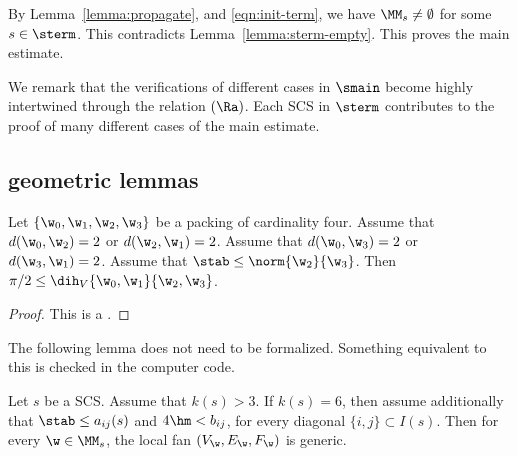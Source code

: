 By Lemma~\ref{lemma:propagate}, and \eqref{eqn:init-term}, we have
$\MM_s\ne\emptyset$ for some $s\in \sterm$. 
This contradicts Lemma~\ref{lemma:sterm-empty}.
  This proves the main estimate.


We remark that the verifications of  different cases in $\smain$ become
highly intertwined through the relation $(\Ra)$.  Each SCS
 in $\sterm$ contributes to the proof of many different cases
of the main estimate.




\subsection{geometric lemmas}

\begin{lemma}\label{lemma:scs-obtuse}
Let $\{\w_0,\w_1,\w_2,\w_3\}$ be a packing of cardinality four.
Assume that $d(\w_0,\w_2)=2$ or $d(\w_2,\w_1)=2$.
Assume that $d(\w_0,\w_3)=2$ or $d(\w_3,\w_1)=2$.
Assume that $\stab\le \norm{\w_2}{\w_3}$.  Then
$\pi/2 \le \dih_V \{\w_0,\w_1 \} \{\w_2,\w_3 \}$.
\end{lemma}

\begin{proof} This is a .
\end{proof}

The following lemma does not need to be formalized.  Something
equivalent
to this is checked in the computer code.


\begin{lemma}\label{lemma:bjo} 
Let $s$ be a SCS.
Assume that $k(s)>3$.
If $k(s)=6$, then assume additionally that
$\stab\le a_{i j}(s)$ and $4\hm < b_{i j}$, 
for every diagonal $\{i,j\}\subset I(s)$.
Then for every  $\w\in\MM_s$,  the local fan $(V_\w,E_\w,F_\w)$ is generic.
\end{lemma}

